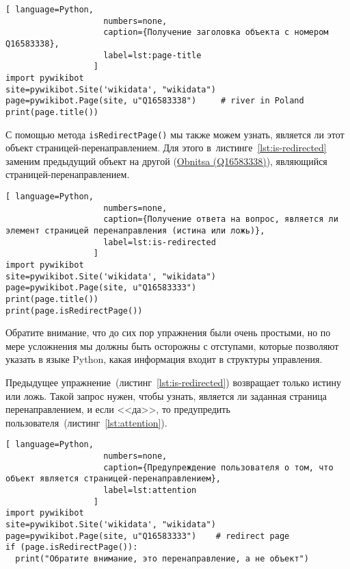 \begin{lstlisting}[ language=Python,
                    numbers=none,
                    caption={Получение заголовка объекта с номером Q16583338},
                    label=lst:page-title
                  ]
import pywikibot
site=pywikibot.Site('wikidata', "wikidata")
page=pywikibot.Page(site, u"Q16583338")     # river in Poland
print(page.title())
\end{lstlisting}

С помощью метода \lstinline|isRedirectPage()| 
мы также можем узнать, является ли этот объект страницей-перенаправлением. 
Для этого в~листинге~\ref{lst:is-redirected} 
заменим предыдущий объект на другой 
(\href{https://www.wikidata.org/w/index.php?title=Q16583333&redirect=no}{Obnitsa (Q16583338)}), 
являющийся страницей-перенаправлением.

\begin{lstlisting}[ language=Python,
                    numbers=none,
                    caption={Получение ответа на вопрос, является ли элемент страницей перенаправления (истина или ложь)},
                    label=lst:is-redirected
                  ]
import pywikibot
site=pywikibot.Site('wikidata', "wikidata")
page=pywikibot.Page(site, u"Q16583333")
print(page.title())
print(page.isRedirectPage())
\end{lstlisting}

Обратите внимание, что до сих пор упражнения были очень простыми, но по мере усложнения мы должны быть осторожны с отступами, которые позволяют указать в языке Python, какая информация входит в структуры управления.

Предыдущее упражнение~(листинг~\ref{lst:is-redirected}) возвращает только истину или ложь. 
Такой запрос нужен, чтобы узнать, является ли заданная страница перенаправлением, 
и если <<да>>, 
то предупредить пользователя~(листинг~\ref{lst:attention}).



\newpage
\begin{lstlisting}[ language=Python,
                    numbers=none,
                    caption={Предупреждение пользователя о том, что объект является страницей-перенаправлением},
                    label=lst:attention
                  ]
import pywikibot
site=pywikibot.Site('wikidata', "wikidata")
page=pywikibot.Page(site, u"Q16583333")    # redirect page
if (page.isRedirectPage()):
  print("Обратите внимание, это перенаправление, а не объект")
\end{lstlisting}

